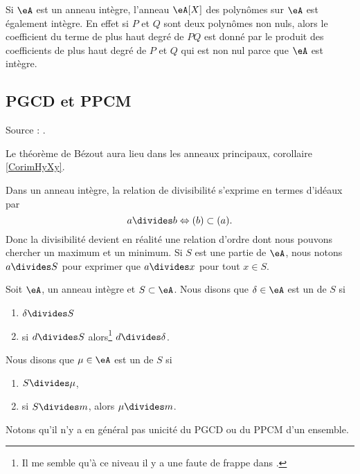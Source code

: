 \begin{example}     \label{ExybCZyl}
    Si \( \eA\) est un anneau intègre, l'anneau \( \eA[X]\) des polynômes sur \( \eA\) est également intègre. En effet si \( P\) et \( Q\) sont deux polynômes non nuls, alors le coefficient du terme de plus haut degré de \( PQ\) est donné par le produit des coefficients de plus haut degré de \( P\) et \( Q\) qui est non nul parce que \( \eA\) est intègre.
\end{example}

\subsection{PGCD et PPCM}
Source : \cite{XPXxPl}.

Le théorème de Bézout aura lieu dans les anneaux principaux, corollaire \ref{CorimHyXy}.

Dans un anneau intègre, la relation de divisibilité s'exprime en termes d'idéaux par
\begin{equation}
    a\divides b\Leftrightarrow (b)\subset (a).
\end{equation}
Donc la divisibilité devient en réalité une relation d'ordre dont nous pouvons chercher un maximum et un minimum. Si \( S\) est une partie de \( \eA\), nous notons \( a\divides S\) pour exprimer que \( a\divides x\) pour tout \( x\in S\).

\begin{definition}\label{DefrYwbct}
    Soit \( \eA\), un anneau intègre et \( S\subset \eA\). Nous disons que \( \delta\in \eA\) est un  de \( S\) si
    \begin{enumerate}
        \item
            \( \delta\divides S\)
        \item
            si \( d\divides S\) alors\footnote{Il me semble qu'à ce niveau il y a une faute de frappe dans \cite{XPXxPl}.} \( d\divides \delta\).
    \end{enumerate}
    Nous disons que \( \mu\in \eA\) est un  de \( S\) si
    \begin{enumerate}
        \item
            \( S\divides \mu\),
        \item
            si \( S\divides m\), alors \( \mu\divides m\).
    \end{enumerate}
\end{definition}
Notons qu'il n'y a en général pas unicité du PGCD ou du PPCM d'un ensemble.

